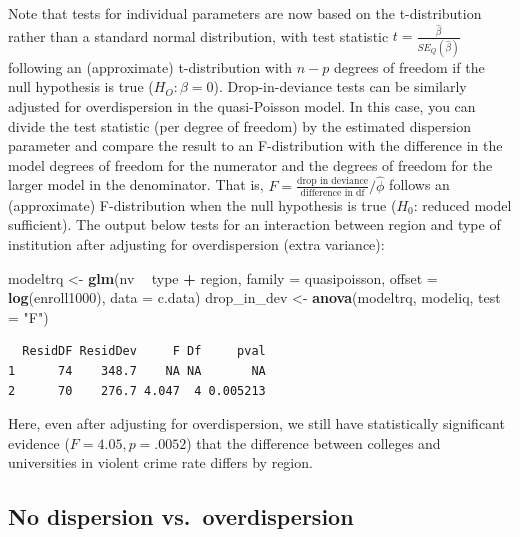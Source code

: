 \documentclass[
]{krantz}
\newenvironment{Shaded}{\begin{snugshade}}{\end{snugshade}}
\newcommand{\DataTypeTok}[1]{\textcolor[rgb]{0.27,0.27,0.27}{#1}}
\newcommand{\KeywordTok}[1]{\textcolor[rgb]{0.27,0.27,0.27}{\textbf{#1}}}
\newcommand{\NormalTok}[1]{#1}
\newcommand{\OperatorTok}[1]{\textcolor[rgb]{0.43,0.43,0.43}{\textbf{#1}}}
\newcommand{\StringTok}[1]{\textcolor[rgb]{0.5,0.5,0.5}{#1}}
\begin{document}
Note that tests for individual parameters are now based on the t-distribution rather than a standard normal distribution, with test statistic \(t=\frac{\hat\beta}{SE_Q(\hat\beta)}\) following an (approximate) t-distribution with \(n-p\) degrees of freedom if the null hypothesis is true (\(H_O:\beta=0\)). Drop-in-deviance tests can be similarly adjusted for overdispersion in the quasi-Poisson model. In this case, you can divide the test statistic (per degree of freedom) by the estimated dispersion parameter and compare the result to an F-distribution with the difference in the model degrees of freedom for the numerator and the degrees of freedom for the larger model in the denominator. That is, \(F=\frac{\textrm{drop in deviance}}{\textrm{difference in df}} / {\hat\phi}\) follows an (approximate) F-distribution when the null hypothesis is true (\(H_0\): reduced model sufficient). The output below tests for an interaction between region and type of institution after adjusting for overdispersion (extra variance):

\begin{Shaded}
\begin{Highlighting}[]
\NormalTok{modeltrq <-}\StringTok{ }\KeywordTok{glm}\NormalTok{(nv }\OperatorTok{~}\StringTok{ }\NormalTok{type }\OperatorTok{+}\StringTok{ }\NormalTok{region, }\DataTypeTok{family =}\NormalTok{ quasipoisson,}
               \DataTypeTok{offset =} \KeywordTok{log}\NormalTok{(enroll1000), }\DataTypeTok{data =}\NormalTok{ c.data)}
\NormalTok{drop_in_dev <-}\StringTok{ }\KeywordTok{anova}\NormalTok{(modeltrq, modeliq, }\DataTypeTok{test =} \StringTok{"F"}\NormalTok{)}
\end{Highlighting}
\end{Shaded}

\begin{verbatim}
  ResidDF ResidDev     F Df     pval
1      74    348.7    NA NA       NA
2      70    276.7 4.047  4 0.005213
\end{verbatim}

Here, even after adjusting for overdispersion, we still have statistically significant evidence (\(F=4.05, p=.0052\)) that the difference between colleges and universities in violent crime rate differs by region.

\hypertarget{no-dispersion-vs.-overdispersion}{%
\subsection{No dispersion vs.~overdispersion}\label{no-dispersion-vs.-overdispersion}}
\end{document}

